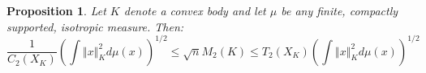 \documentclass[12pt,oneside]{amsart}
\newtheorem{prop}[thm]{Proposition}
\theoremstyle{definition}
\theoremstyle{remark}
\theoremstyle{proof}
\numberwithin{equation}{section}
\newcommand{\norm}[1]{\left\Vert#1\right\Vert}
\newcommand{\abs}[1]{\left\vert#1\right\vert}
\newcommand{\brac}[1]{\left(#1\right)}
\newcommand{\scalar}[1]{\left \langle #1 \right \rangle}
\begin{document}

\begin{prop} \label{prop:isotropic-prop}
Let $K$ denote a convex body and let $\mu$ be any finite,
compactly supported, isotropic measure. Then:
\[
\frac{1}{C_2(X_K)} \brac{\int \norm{x}^2_K d\mu(x)}^{1/2} \leq
\sqrt{n} M_2(K) \leq T_2(X_K) \brac{\int \norm{x}^2_K
d\mu(x)}^{1/2}
\]
\end{prop}
\end{document}
